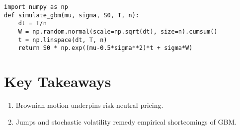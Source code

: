 \begin{verbatim}
import numpy as np
def simulate_gbm(mu, sigma, S0, T, n):
    dt = T/n
    W = np.random.normal(scale=np.sqrt(dt), size=n).cumsum()
    t = np.linspace(dt, T, n)
    return S0 * np.exp((mu-0.5*sigma**2)*t + sigma*W)
\end{verbatim}

\section*{Key Takeaways}
\begin{enumerate}
  \item Brownian motion underpins risk‑neutral pricing.
  \item Jumps and stochastic volatility remedy empirical shortcomings of GBM.
\end{enumerate}
